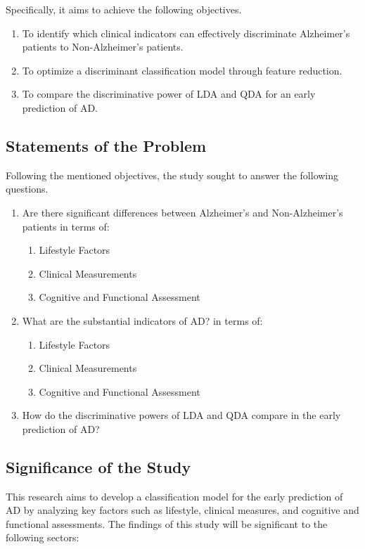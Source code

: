 \documentclass[12pt]{article}
\begin{document}
Specifically, it aims to achieve the following objectives. 

\begin{enumerate}
    \item To identify which clinical indicators can effectively discriminate Alzheimer's patients to Non-Alzheimer's patients. 
    \item To optimize a discriminant classification model through feature reduction. 
    \item To compare the discriminative power of LDA and QDA for an early prediction of AD. 
\end{enumerate}

\subsection{Statements of the Problem}
\noindent

Following the mentioned objectives, the study sought to answer the following questions. 
\begin{enumerate}
    \item Are there significant differences between Alzheimer's and Non-Alzheimer's patients in terms of:
    \begin{enumerate}
        \item Lifestyle Factors
        \item Clinical Measurements
        \item Cognitive and Functional Assessment
    \end{enumerate}
    \item What are the substantial indicators of AD? in terms of: 
    \begin{enumerate}
        \item Lifestyle Factors
        \item Clinical Measurements
        \item Cognitive and Functional Assessment
    \end{enumerate}
    \item How do the discriminative powers of LDA and QDA compare in the early prediction of AD?
\end{enumerate}

\subsection{Significance of the Study}
\noindent

This research aims to develop a classification model for the early prediction of AD by analyzing key factors such as lifestyle, clinical measures, and cognitive and functional assessments. 
The findings of this study will be significant to the following sectors: 
\end{document}
